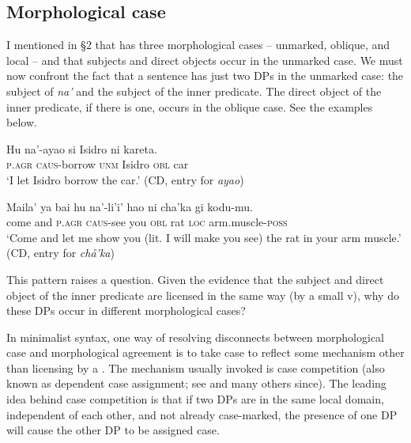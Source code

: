 \documentclass[output=paper,
modfonts
]{LSP/langsci}
\begin{document}
\begin{exe}
\begin{xlist}
\subsection{Morphological case}

I mentioned in \S2 that  has three morphological
cases -- unmarked, oblique, and local -- and that subjects and direct
objects occur in the unmarked case. We must now confront the fact that a
 sentence has just two DPs in the unmarked case: the subject of
\emph{na'} and the subject of the inner predicate. The direct object of
the inner predicate, if there is one, occurs in the oblique case. See
the examples below.

\ea \label{ex:chung:34}
\ea \label{ex:chung:34a}
\gll Hu na'-ayao si Isidro ni kareta.\\
\textsc{p.agr} \textsc{caus-}borrow \textsc{unm} Isidro \textsc{obl} car\\
\glt `I let Isidro borrow the car.' (CD, entry for \emph{ayao})

\ex \label{ex:chung:34b} \gll Maila' ya {bai hu} na'-li'i' hao ni cha'ka gi kodu-mu.\\
come and \textsc{p.agr} \textsc{caus-}see you \textsc{obl} rat \textsc{loc} arm.muscle-\textsc{poss}\\
\glt `Come and let me show you (lit. I will make you see) the rat in your arm muscle.' (CD, entry for \emph{chå'ka})
\z
\z

This pattern raises a question. Given the  evidence that the
subject and direct object of the inner predicate are licensed in the
same way (by a small v), why do these DPs occur in different
morphological cases?

In minimalist syntax, one way of resolving disconnects between
morphological case and morphological agreement is to take case to
reflect some mechanism other than licensing by a . The
mechanism usually invoked is case competition (also known as dependent
case assignment; see \citealt{marantz1991} and many others since). The leading
idea behind case competition is that if two DPs are in the same local
domain, independent of each other, and not already case-marked, the
presence of one DP will cause the other DP to be assigned case.


\end{xlist}
\end{exe}
\end{document}
